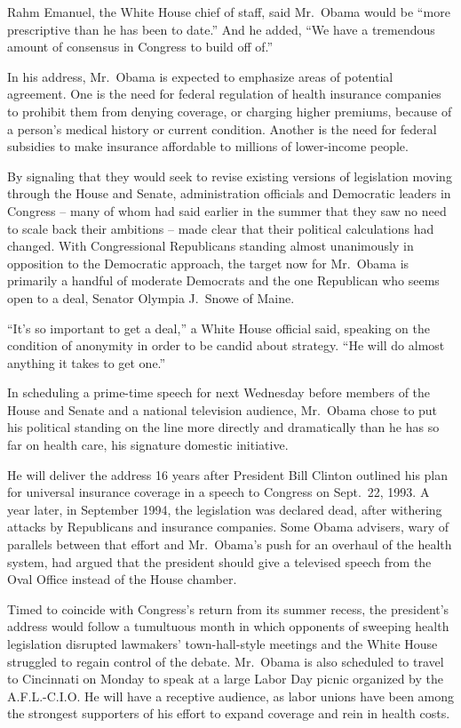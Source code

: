 ﻿\documentclass[12pt]{article}
\begin{document}
Rahm Emanuel, the White House chief of staff, said Mr.~Obama would be ``more prescriptive than he
has been to date.'' And he added, ``We have a tremendous amount of consensus in Congress to build
off of.''

In his address, Mr.~Obama is expected to emphasize areas of potential agreement. One is the need for
federal regulation of health insurance companies to prohibit them from denying coverage, or charging
higher premiums, because of a person's medical history or current condition. Another is the need for
federal subsidies to make insurance affordable to millions of lower-income people.

By signaling that they would seek to revise existing versions of legislation moving through the
House and Senate, administration officials and Democratic leaders in Congress -- many of whom had
said earlier in the summer that they saw no need to scale back their ambitions -- made clear that
their political calculations had changed. With Congressional Republicans standing almost unanimously
in opposition to the Democratic approach, the target now for Mr.~Obama is primarily a handful of
moderate Democrats and the one Republican who seems open to a deal, Senator Olympia J.~Snowe of
Maine.

``It's so important to get a deal,'' a White House official said, speaking on the condition of
anonymity in order to be candid about strategy. ``He will do almost anything it takes to get one.''

In scheduling a prime-time speech for next Wednesday before members of the House and Senate and a
national television audience, Mr.~Obama chose to put his political standing on the line more
directly and dramatically than he has so far on health care, his signature domestic initiative.

He will deliver the address 16 years after President Bill Clinton outlined his plan for universal
insurance coverage in a speech to Congress on Sept.~22, 1993. A year later, in September 1994, the
legislation was declared dead, after withering attacks by Republicans and insurance companies. Some
Obama advisers, wary of parallels between that effort and Mr.~Obama's push for an overhaul of the
health system, had argued that the president should give a televised speech from the Oval Office
instead of the House chamber.

Timed to coincide with Congress's return from its summer recess, the president's address would
follow a tumultuous month in which opponents of sweeping health legislation disrupted lawmakers'
town-hall-style meetings and the White House struggled to regain control of the debate. Mr.~Obama is
also scheduled to travel to Cincinnati on Monday to speak at a large Labor Day picnic organized by
the A.F.L.-C.I.O. He will have a receptive audience, as labor unions have been among the strongest
supporters of his effort to expand coverage and rein in health costs.
\end{document}
